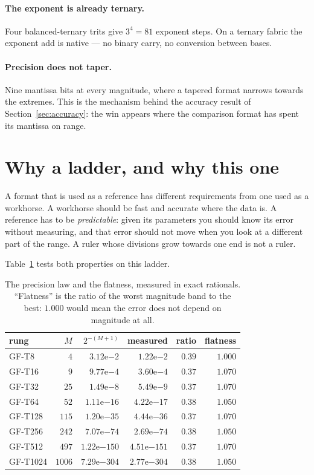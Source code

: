 \documentclass[11pt]{article}
\theoremstyle{definition}
\begin{document}
\paragraph{The exponent is already ternary.} Four balanced-ternary trits give
$3^4=81$ exponent steps. On a ternary fabric the exponent add is native --- no
binary carry, no conversion between bases.

\paragraph{Precision does not taper.} Nine mantissa bits at every magnitude,
where a tapered format narrows towards the extremes. This is the mechanism behind
the accuracy result of Section~\ref{sec:accuracy}: the win appears where the
comparison format has spent its mantissa on range.


\section{Why a ladder, and why this one}\label{sec:ruler}

A format that is used as a reference has different requirements from one used as
a workhorse. A workhorse should be fast and accurate where the data is. A
reference has to be \emph{predictable}: given its parameters you should know its
error without measuring, and that error should not move when you look at a
different part of the range. A ruler whose divisions grow towards one end is not
a ruler.

Table~\ref{tab:law} tests both properties on this ladder.

\begin{table}[t]\centering
\caption{The precision law and the flatness, measured in exact rationals.
``Flatness'' is the ratio of the worst magnitude band to the best: $1.000$ would
mean the error does not depend on magnitude at all.}
\label{tab:law}
\begin{tabular}{lrrrrr}
\toprule
rung & $M$ & $2^{-(M+1)}$ & measured & ratio & flatness \\
\midrule
GF-T8    & $4$    & $3.12\mathrm{e}{-2}$   & $1.22\mathrm{e}{-2}$   & $0.39$ & $1.000$ \\
GF-T16   & $9$    & $9.77\mathrm{e}{-4}$   & $3.60\mathrm{e}{-4}$   & $0.37$ & $1.070$ \\
GF-T32   & $25$   & $1.49\mathrm{e}{-8}$   & $5.49\mathrm{e}{-9}$   & $0.37$ & $1.070$ \\
GF-T64   & $52$   & $1.11\mathrm{e}{-16}$  & $4.22\mathrm{e}{-17}$  & $0.38$ & $1.050$ \\
GF-T128  & $115$  & $1.20\mathrm{e}{-35}$  & $4.44\mathrm{e}{-36}$  & $0.37$ & $1.070$ \\
GF-T256  & $242$  & $7.07\mathrm{e}{-74}$  & $2.69\mathrm{e}{-74}$  & $0.38$ & $1.050$ \\
GF-T512  & $497$  & $1.22\mathrm{e}{-150}$ & $4.51\mathrm{e}{-151}$ & $0.37$ & $1.070$ \\
GF-T1024 & $1006$ & $7.29\mathrm{e}{-304}$ & $2.77\mathrm{e}{-304}$ & $0.38$ & $1.050$ \\
\bottomrule
\end{tabular}
\end{table}
\end{document}

